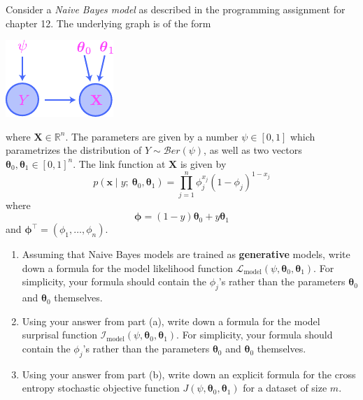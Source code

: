 \documentclass[12pt,reqno]{amsart}
\begin{document}
\bigskip

\prob Consider a \textit{Naive Bayes model} as described in the programming assignment for chapter 12. The underlying graph is of the form

\bigskip
\begin{center}
\includegraphics[scale=1.5]{nb}
\end{center}
\bigskip

where $\mathbf{X} \in \mathbb{R}^n$. The parameters are given by a number $\psi\in [0,1]$ which parametrizes the distribution of $Y\sim \mathcal{B}er(\psi)$, as well as two vectors $\boldsymbol{\theta}_0, \boldsymbol{\theta}_1 \in [0,1]^n$. The link function at $\mathbf{X}$ is given by
	\[
	p(\mathbf{x} \mid y ; \  \boldsymbol{\theta}_0, \boldsymbol{\theta}_1 ) = \prod_{j=1}^n \phi_j^{x_j}(1-\phi_j)^{1-x_j}
	\]
where
	\[
	\boldsymbol{\phi} = (1-y) \boldsymbol{\theta}_0 + y \boldsymbol{\theta}_1
	\]
and	$\boldsymbol{\phi}^\intercal = (\phi_1,\ldots,\phi_n)$.

\bigskip
\begin{enumerate}
\item Assuming that Naive Bayes models are trained as \textbf{generative} models, write down a formula for the model likelihood function $\mathcal{L}_\text{model}(\psi,\boldsymbol{\theta}_0,\boldsymbol{\theta}_1)$. For simplicity, your formula should contain the $\phi_j$'s rather than the parameters $\boldsymbol{\theta}_0$ and $\boldsymbol{\theta}_0$ themselves.\vfill
\item Using your answer from part (a), write down a formula for the model surprisal function $\mathcal{I}_\text{model}(\psi,\boldsymbol{\theta}_0,\boldsymbol{\theta}_1)$. For simplicity, your formula should contain the $\phi_j$'s rather than the parameters $\boldsymbol{\theta}_0$ and $\boldsymbol{\theta}_0$ themselves.\vfill
\item Using your answer from part (b), write down an explicit formula for the cross entropy stochastic objective function $J(\psi,\boldsymbol{\theta}_0,\boldsymbol{\theta}_1)$ for a dataset of size $m$.\vfill
\end{enumerate}
\end{document}
